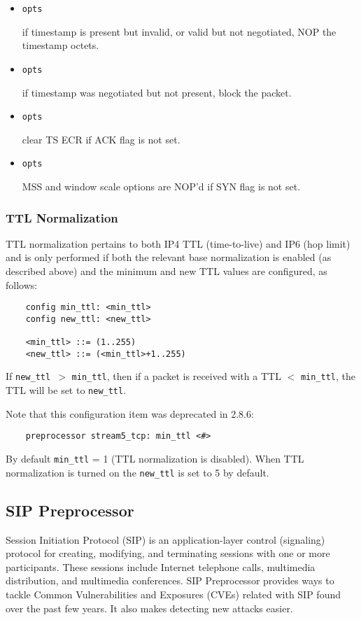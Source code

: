 \documentclass[english]{report}
\begin{document}
\begin{itemize}
\item \texttt{opts} 

if timestamp is present but invalid, or valid but not negotiated, NOP the
timestamp octets.

\item \texttt{opts} 

if timestamp was negotiated but not present, block the packet.

\item \texttt{opts} 

clear TS ECR if ACK flag is not set.

\item \texttt{opts} 

MSS and window scale options are NOP'd if SYN flag is not set.

\end{itemize} 

\subsubsection{TTL Normalization}

TTL normalization pertains to both IP4 TTL (time-to-live) and IP6 (hop limit)
and is only performed if both the relevant base normalization is enabled (as
described above) and the minimum and new TTL values are configured, as follows:

\begin{verbatim}
    config min_ttl: <min_ttl>
    config new_ttl: <new_ttl>

    <min_ttl> ::= (1..255)
    <new_ttl> ::= (<min_ttl>+1..255)
\end{verbatim}

If \texttt{new\_ttl }$>$ \texttt{min\_ttl}, then if a packet is received with a
TTL $<$ \texttt{min\_ttl}, the TTL will be set to \texttt{new\_ttl}.

Note that this configuration item was deprecated in 2.8.6:

\begin{verbatim}
    preprocessor stream5_tcp: min_ttl <#>
\end{verbatim}

By default \texttt{min\_ttl} = 1 (TTL normalization is disabled). 
When TTL normalization is turned on the \texttt{new\_ttl} is set
to 5 by default.

\subsection{SIP Preprocessor}
\label{sub:sip}
Session Initiation Protocol (SIP) is an application-layer control (signaling)
protocol for creating,   modifying, and terminating sessions with one or more 
participants.  These sessions include Internet telephone calls, multimedia 
distribution, and multimedia conferences. SIP Preprocessor provides ways to 
tackle Common Vulnerabilities and Exposures (CVEs) related with SIP found over 
the past few years. It also makes detecting new attacks easier.
\end{document}
